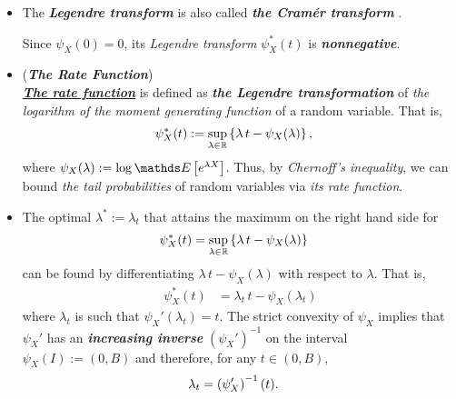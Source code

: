 \documentclass[11pt]{article}
\begin{document}
\begin{itemize}
\item \begin{remark}
The \textbf{\emph{Legendre transform}} is also called \emph{\textbf{the Cram{\'e}r transform}} \citep{boucheron2013concentration}.

Since $\psi_{X}(0) = 0$, its \emph{Legendre transform} $\psi^{*}_{X}(t)$ is \emph{\textbf{nonnegative}}.
\end{remark}

\item \begin{definition} (\textbf{\emph{The Rate Function}})\\
\underline{\emph{\textbf{The rate function}}} is defined as \emph{\textbf{the Legendre transformation}} of \emph{the logarithm of the moment generating function} of a random variable. That is, 
\begin{align}
\psi^{*}_{X}(t) &:= \sup_{\lambda \in {\mathbb R}}\left\{\lambda\,t - \psi_{X}(\lambda)\right\}, \label{eqn: rate_function}
\end{align} where $\psi_{X}(\lambda) := \log   \E{}{e^{\lambda X}}$. Thus, by \emph{Chernoff's inequality}, we can bound \emph{the tail probabilities} of random variables via \emph{its rate function}.
\end{definition}

\item \begin{remark}
The optimal $\lambda^{*}:= \lambda_t$ that attains the maximum on the right hand side for  
\begin{align*}
\psi^{*}_{X}(t) &= \sup_{\lambda \in {\mathbb R}}\left\{\lambda\,t - \psi_{X}(\lambda)\right\}
\end{align*} can be found by differentiating $\lambda\,t - \psi_{X}(\lambda)$ with respect to $\lambda$. That is,
\begin{align*}
\psi^{*}_{X}(t) &= \lambda_t\,t -  \psi_{X}(\lambda_t)
\end{align*} where $\lambda_t$ is such that $\psi_{X}'(\lambda_t) = t$. The strict convexity of $\psi_{X}$ implies that $\psi_{X}'$  has an
\emph{\textbf{increasing inverse}} $(\psi_{X}')^{-1}$ on the interval $\psi_X(I) := (0, B)$ and therefore, for any $t \in (0, B)$,
\begin{align*}
\lambda_t &= \left(\psi_{X}'\right)^{-1}(t).
\end{align*}
\end{remark}


\end{itemize}
\end{document}
